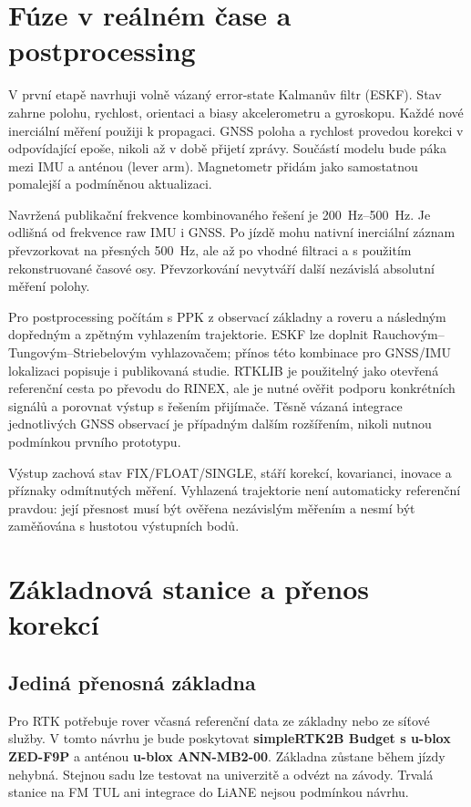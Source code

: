\section{Fúze v reálném čase a postprocessing}

V první etapě navrhuji volně vázaný error-state Kalmanův filtr (ESKF).
Stav zahrne polohu, rychlost, orientaci a biasy akcelerometru a gyroskopu.
Každé nové inerciální měření použiji k propagaci. GNSS poloha a rychlost
provedou korekci v odpovídající epoše, nikoli až v době přijetí zprávy.
Součástí modelu bude páka mezi IMU a anténou (lever arm). Magnetometr přidám
jako samostatnou pomalejší a podmíněnou aktualizaci.

Navržená publikační frekvence kombinovaného řešení je \SIrange{200}{500}{Hz}.
Je odlišná od frekvence raw IMU i GNSS. Po jízdě mohu nativní inerciální
záznam převzorkovat na přesných \SI{500}{Hz}, ale až po vhodné filtraci a
s použitím rekonstruované časové osy. Převzorkování nevytváří další nezávislá
absolutní měření polohy.

Pro postprocessing počítám s PPK z observací základny a roveru a následným
dopředným a zpětným vyhlazením trajektorie. ESKF lze doplnit
Rauchovým--Tungovým--Striebelovým vyhlazovačem; přínos této kombinace pro
GNSS/IMU lokalizaci popisuje i publikovaná studie.\cite{wang-esfk-rts}
RTKLIB je použitelný jako otevřená referenční cesta po převodu do RINEX,
ale je nutné ověřit podporu konkrétních signálů a porovnat výstup s řešením
přijímače.\cite{takasu-rtklib,rtklib-site}
Těsně vázaná integrace jednotlivých GNSS observací je případným dalším
rozšířením, nikoli nutnou podmínkou prvního prototypu.

Výstup zachová stav FIX/FLOAT/SINGLE, stáří korekcí, kovarianci, inovace a
příznaky odmítnutých měření. Vyhlazená trajektorie není automaticky
referenční pravdou: její přesnost musí být ověřena nezávislým měřením
a nesmí být zaměňována s hustotou výstupních bodů.

\section{Základnová stanice a přenos korekcí}

\subsection{Jediná přenosná základna}

Pro RTK potřebuje rover včasná referenční data ze základny nebo ze síťové
služby. V tomto návrhu je bude poskytovat \textbf{simpleRTK2B Budget s
u-blox ZED-F9P} a anténou \textbf{u-blox ANN-MB2-00}. Základna
zůstane během jízdy nehybná. Stejnou sadu lze testovat na univerzitě
a odvézt na závody. Trvalá stanice na FM TUL ani integrace do LiANE
nejsou podmínkou návrhu.

